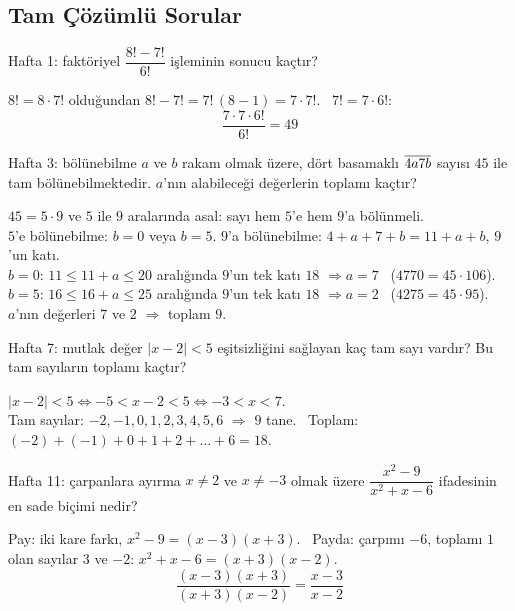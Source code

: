\subsection*{Tam Çözümlü Sorular}

\begin{karma}{Hafta 1: faktöriyel}
\(\dfrac{8!-7!}{6!}\) işleminin sonucu kaçtır?
\end{karma}
\begin{cozum}
\(8!=8\cdot 7!\) olduğundan \(8!-7!=7!\,(8-1)=7\cdot 7!\). \ \(7!=7\cdot 6!\):
\[\frac{7\cdot 7\cdot 6!}{6!}=49\]
\end{cozum}

\begin{karma}{Hafta 3: bölünebilme}
\(a\) ve \(b\) rakam olmak üzere, dört basamaklı \(\overline{4a7b}\) sayısı \(45\) ile tam bölünebilmektedir. \(a\)'nın alabileceği değerlerin toplamı kaçtır?
\end{karma}
\begin{cozum}
\(45=5\cdot 9\) ve \(5\) ile \(9\) aralarında asal: sayı hem \(5\)'e hem \(9\)'a bölünmeli.\\
\(5\)'e bölünebilme: \(b=0\) veya \(b=5\). \quad \(9\)'a bölünebilme: \(4+a+7+b=11+a+b\), \(9\)'un katı.\\
\(b=0\): \(11\le 11+a\le 20\) aralığında \(9\)'un tek katı \(18\) \(\Rightarrow a=7\) \ (\(4770=45\cdot 106\)).\\
\(b=5\): \(16\le 16+a\le 25\) aralığında \(9\)'un tek katı \(18\) \(\Rightarrow a=2\) \ (\(4275=45\cdot 95\)).\\
\(a\)'nın değerleri \(7\) ve \(2\) \(\Rightarrow\) toplam \(9\).
\end{cozum}

\begin{karma}{Hafta 7: mutlak değer}
\(|x-2|<5\) eşitsizliğini sağlayan kaç tam sayı vardır? Bu tam sayıların toplamı kaçtır?
\end{karma}
\begin{cozum}
\(|x-2|<5\iff -5<x-2<5\iff -3<x<7\).\\
Tam sayılar: \(-2,-1,0,1,2,3,4,5,6\) \(\Rightarrow\) \(9\) tane. \ Toplam: \((-2)+(-1)+0+1+2+\dots+6=18\).
\end{cozum}

\begin{karma}{Hafta 11: çarpanlara ayırma}
\(x\neq 2\) ve \(x\neq -3\) olmak üzere \(\dfrac{x^2-9}{x^2+x-6}\) ifadesinin en sade biçimi nedir?
\end{karma}
\begin{cozum}
Pay: iki kare farkı, \(x^2-9=(x-3)(x+3)\). \ Payda: çarpımı \(-6\), toplamı \(1\) olan sayılar \(3\) ve \(-2\): \(x^2+x-6=(x+3)(x-2)\).
\[\frac{(x-3)(x+3)}{(x+3)(x-2)}=\frac{x-3}{x-2}\]
\end{cozum}

